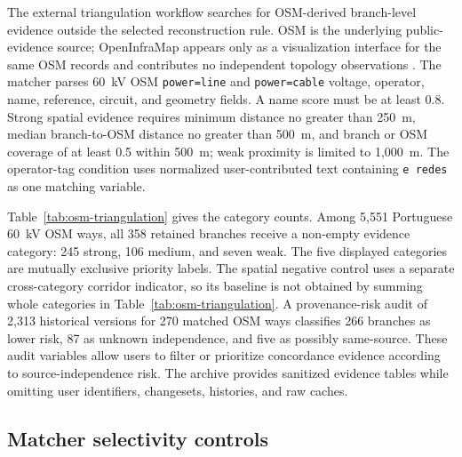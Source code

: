 \documentclass[10pt]{article}
\newcommand{\code}[1]{\texttt{#1}}
\begin{document}
The external triangulation workflow searches for OSM-derived branch-level evidence outside the selected reconstruction rule. OSM is the underlying public-evidence source; OpenInfraMap appears only as a visualization interface for the same OSM records and contributes no independent topology observations \cite{OSM2026,OpenInfraMap2026}. The matcher parses 60~kV OSM \code{power=line} and \code{power=cable} voltage, operator, name, reference, circuit, and geometry fields. A name score must be at least 0.8. Strong spatial evidence requires minimum distance no greater than 250~m, median branch-to-OSM distance no greater than 500~m, and branch or OSM coverage of at least 0.5 within 500~m; weak proximity is limited to 1,000~m. The operator-tag condition uses normalized user-contributed text containing \code{e redes} as one matching variable.

\begin{table}[t]
\centering
\small
\caption{OSM-derived public-evidence categories for the 358 retained candidate branches. The categories support branch-level review prioritization; machine category codes and matching variables remain in the deposited validation table.}
\label{tab:osm-triangulation}

\end{table}

Table~\ref{tab:osm-triangulation} gives the category counts. Among 5,551 Portuguese 60~kV OSM ways, all 358 retained branches receive a non-empty evidence category: 245 strong, 106 medium, and seven weak. The five displayed categories are mutually exclusive priority labels. The spatial negative control uses a separate cross-category corridor indicator, so its baseline is not obtained by summing whole categories in Table~\ref{tab:osm-triangulation}. A provenance-risk audit of 2,313 historical versions for 270 matched OSM ways classifies 266 branches as lower risk, 87 as unknown independence, and five as possibly same-source. These audit variables allow users to filter or prioritize concordance evidence according to source-independence risk. The archive provides sanitized evidence tables while omitting user identifiers, changesets, histories, and raw caches.

\subsection{Matcher selectivity controls}
\end{document}
